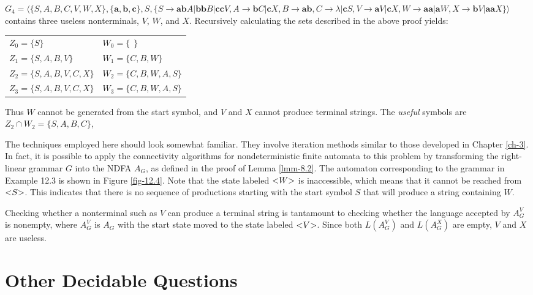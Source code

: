 $G_4=\langle\{S,A,B,C,V,W,X\},\{\pmb{a},\pmb{b},\pmb{c}\},S,\{S\rightarrow\pmb{a
b}A|\pmb{bb}B|\pmb{cc}V,A\rightarrow\pmb{b}C|\pmb{c}X,B\rightarrow\pmb{ab},
C\rightarrow\lambda|\pmb{c}S,V\rightarrow\pmb{a}V|\pmb{c}X,W\rightarrow\pmb{aa}|
\pmb{a}W,X\rightarrow\pmb{b}V|\pmb{aa}X\}\rangle$ contains three useless
nonterminals, $V$, $W$, and $X$. Recursively calculating the sets described in
the above proof yields:
\begin{center}\begin{tabular}{l@{$\quad$}l}
$Z_0=\{S\}$ & $W_0=\{\ \ \}$ \\
$Z_1=\{S,A,B,V\}$ & $W_1=\{C,B,W\}$ \\ 
$Z_2=\{S,A,B,V,C,X\}$ & $W_2=\{C,B,W,A,S\}$ \\ 
$Z_3=\{S,A,B,V,C,X\}$ & $W_3=\{C,B,W,A,S\}$
\end{tabular}\end{center}
Thus $W$ cannot be generated from the start symbol, and $V$ and $X$ cannot
produce terminal strings. The \emph{useful} symbols are $Z_2\cap W_2=\{S,A,B,C\}$,

The techniques employed here should look somewhat familiar. They involve
iteration methods similar to those developed in Chapter \ref{ch-3}. In fact, it
is possible to apply the connectivity algorithms for nondeterministic finite
automata to this problem by transforming the right-linear grammar $G$ into the
NDFA $A_G$, as defined in the proof of Lemma \ref{lmm-8.2}. The automaton
corresponding to the grammar in Example 12.3 is shown in Figure
\ref{fig-12.4}. Note that the state labeled $\text{\textless}W\text{\textgreater}$ is inaccessible, which
means that it cannot be reached from $\text{\textless}S\text{\textgreater}$. This indicates that there is no
sequence of productions starting with the start symbol $S$ that will produce
a string containing $W$.

Checking whether a nonterminal such as $V$ can produce a terminal string is
tantamount to checking whether the language accepted by $A^V_G$ is nonempty,
where $A^V_G$ is $A_G$ with the start state moved to the state labeled $\text{\textless}V\text{\textgreater}$.
Since both $L(A^V_G)$ and $L(A^X_G)$ are empty, $V$ and $X$ are useless.

\section{Other Decidable Questions}\label{sec-12.2}

